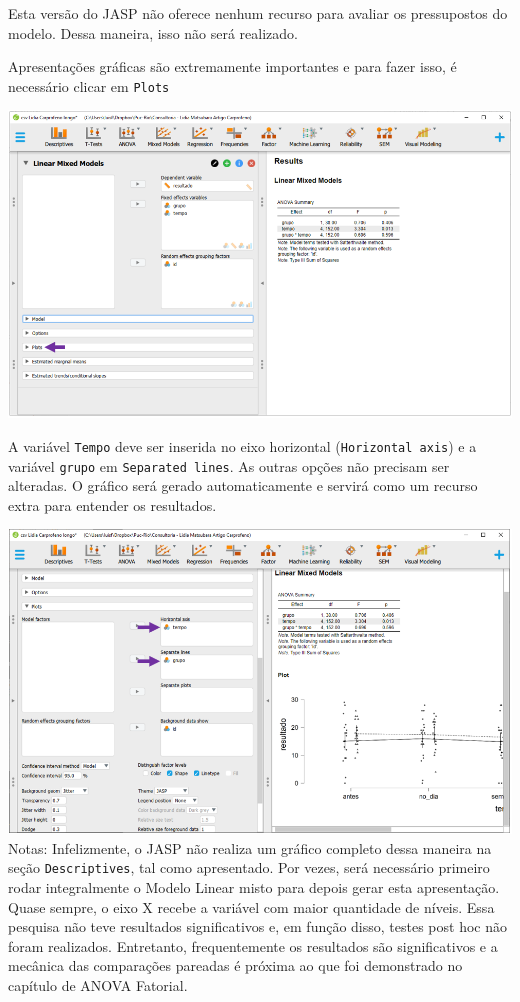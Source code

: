 \documentclass[
]{book}
\begin{document}
Esta versão do JASP não oferece nenhum recurso para avaliar os pressupostos do modelo. Dessa maneira, isso não será realizado.

Apresentações gráficas são extremamente importantes e para fazer isso, é necessário clicar em \texttt{Plots}

\includegraphics{./img/cap_lmm_resultados_plots.png}

A variável \texttt{Tempo} deve ser inserida no eixo horizontal (\texttt{Horizontal\ axis}) e a variável \texttt{grupo} em \texttt{Separated\ lines}. As outras opções não precisam ser alteradas. O gráfico será gerado automaticamente e servirá como um recurso extra para entender os resultados.

\includegraphics{./img/cap_lmm_resultados_plots2.png}
Notas: Infelizmente, o JASP não realiza um gráfico completo dessa maneira na seção \texttt{Descriptives}, tal como apresentado. Por vezes, será necessário primeiro rodar integralmente o Modelo Linear misto para depois gerar esta apresentação. Quase sempre, o eixo X recebe a variável com maior quantidade de níveis. Essa pesquisa não teve resultados significativos e, em função disso, testes post hoc não foram realizados. Entretanto, frequentemente os resultados são significativos e a mecânica das comparações pareadas é próxima ao que foi demonstrado no capítulo de ANOVA Fatorial.
\end{document}
